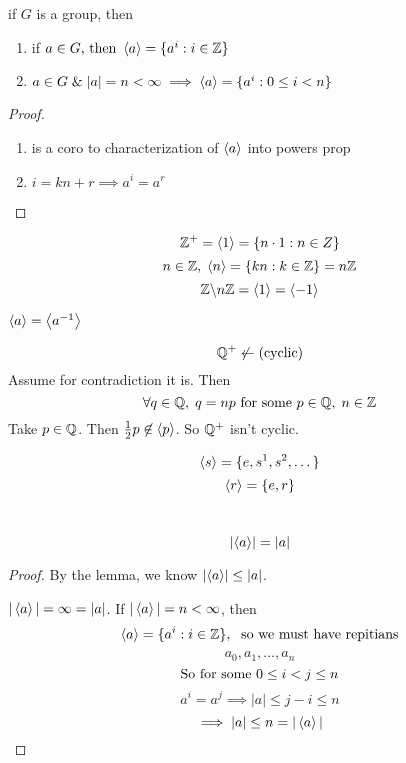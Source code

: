 \documentclass[12pt]{article}
\begin{document}
\bboxlem
\begin{lem}
  if \(G\) is a group, then
  \begin{enumerate}
    \item if \(a\in G\text{, then }\left\langle a\right\rangle=\{a^i:i\in\mathbb Z\}\)
    \item \(a\in G\;\&\;|a|=n<\infty\implies\left\langle a\right\rangle=\{a^i:0\le i<n\}\)
  \end{enumerate}
\end{lem}
\ebox

\bboxproof
\begin{proof}[Proof]\
  \begin{enumerate}
    \item is a coro to characterization of \(\left\langle a\right\rangle\) into powers prop
    \item \(i=kn+r\implies a^i=a^r\)
  \end{enumerate}
\end{proof}
\ebox

\bboxexam
\begin{exam}
  \[
    \mathbb Z^+=\left\langle 1\right\rangle=\{n\cdot 1:n\in Z\}
  \]
  \[
    n\in\mathbb Z,\;\left\langle n\right\rangle
    =\{kn:k\in\mathbb Z\}
    =n\mathbb Z
  \]
  \[
    \mathbb Z\backslash n\mathbb Z
    =\left\langle 1\right\rangle=\left\langle -1\right\rangle
  \]
  \bboxnote
  \begin{note}
    \(\left\langle a\right\rangle=\left\langle a^{-1}\right\rangle\)
  \end{note}
  \ebox
\end{exam}
\ebox

\bboxexam
\begin{exam}
  \[
    \mathbb Q^+\not\leftarrow(\mathrm{cyclic})
  \]
  Assume for contradiction it is.
  Then
  \[
    \forall q\in\mathbb Q,\;
    q=np\text{ for some }
      p\in\mathbb Q,\;
    n\in\mathbb Z
  \]
  Take \(p\in\mathbb Q\). Then
  \(\frac12p\not\in\left\langle p\right\rangle\).
  So \(\mathbb Q^+\) isn't cyclic.
\end{exam}
\ebox

\bboxexam
\begin{exam}
  \[\left\langle s\right\rangle=\{e,s^1,s^2,\dots\}\]
  \[\left\langle r\right\rangle=\{e,r\}\]
\end{exam}
\ebox

\bboxprop
\begin{prop}[Order of a = Order of gen(a)]\
  \[|\!\left\langle a\right\rangle\!|=|a|\]
\end{prop}
\ebox

\bboxproof
\begin{proof}[Proof]
  By the lemma, we know \(|\!\left\langle a\right\rangle\!|\le|a|\).

  \(|\left\langle a\right\rangle|=\infty=|a|\). If \(|\left\langle a\right\rangle|=n<\infty\), then
  \[\left\langle a\right\rangle=\{a^i:i\in\mathbb Z\},\;\text{ so we must have repitians}\]
  \[a_0,a_1,\dots,a_n\]
  \[\text{So for some }0\le i<j\le n\]
  \[a^i=a^j\implies|a|\le j-i\le n\]
  \[\implies|a|\le n=|\left\langle a\right\rangle|\]
\end{proof}
\ebox
\end{document}
